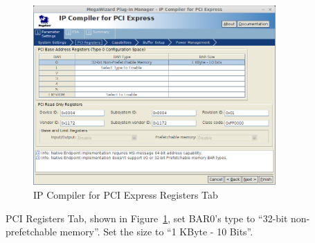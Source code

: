 \documentclass{refrep}
\begin{document}
\begin{figure}[H]
  \includegraphics[width=350px,center]{IPCompilerPCIeTabPCIRegisters.png}
  \caption{IP Compiler for PCI Express Registers Tab}
  \label{Fig:Altera:IPCompiler:PCIRegisters}
\end{figure}
PCI Registers Tab, shown in Figure~\ref{Fig:Altera:IPCompiler:PCIRegisters}, set
BAR0's type to ``32-bit non-prefetchable memory''. Set the size to ``1 KByte -
10 Bits''.
\end{document}
